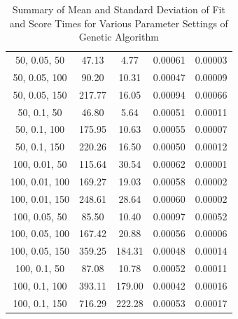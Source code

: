 \documentclass[
]{article}
\begin{document}
\begin{table}[H]
{\begin{tabular}{|c|c|c|c|c|}
                50, 0.05, 50               & 47.13                  & 4.77                  & 0.00061                  & 0.00003                 \\
                50, 0.05, 100              & 90.20                  & 10.31                 & 0.00047                  & 0.00009                 \\
                50, 0.05, 150              & 217.77                 & 16.05                 & 0.00094                  & 0.00066                 \\
                50, 0.1, 50                & 46.80                  & 5.64                  & 0.00051                  & 0.00011                 \\
                50, 0.1, 100               & 175.95                 & 10.63                 & 0.00055                  & 0.00007                 \\
                50, 0.1, 150               & 220.26                 & 16.50                 & 0.00050                  & 0.00012                 \\
                100, 0.01, 50              & 115.64                 & 30.54                 & 0.00062                  & 0.00001                 \\
                100, 0.01, 100             & 169.27                 & 19.03                 & 0.00058                  & 0.00002                 \\
                100, 0.01, 150             & 248.61                 & 28.64                 & 0.00060                  & 0.00002                 \\
                100, 0.05, 50              & 85.50                  & 10.40                 & 0.00097                  & 0.00052                 \\
                100, 0.05, 100             & 167.42                 & 20.88                 & 0.00056                  & 0.00006                 \\
                100, 0.05, 150             & 359.25                 & 184.31                & 0.00048                  & 0.00014                 \\
                100, 0.1, 50               & 87.08                  & 10.78                 & 0.00052                  & 0.00011                 \\
                100, 0.1, 100              & 393.11                 & 179.00                & 0.00042                  & 0.00016                 \\
                100, 0.1, 150              & 716.29                 & 222.28                & 0.00053                  & 0.00017                 \\
                \hline
            \end{tabular}
        }
        \caption{Summary of Mean and Standard Deviation of Fit and Score Times for Various Parameter Settings of Genetic Algorithm}
        \label{tab:ga_summary_fit_score_times}
    \end{table}
\end{document}
